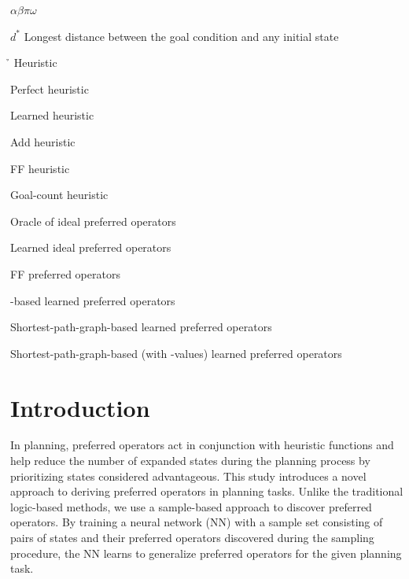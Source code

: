 \documentclass[ppgc,diss,english]{iiufrgs}
\begin{document}
\begin{listofsymbols}{$\alpha\beta\pi\omega$}
       \item[$d^{*}$] Longest distance between the goal condition and any initial state
       \item[\h] Heuristic
       \item[\hstar] Perfect heuristic
       \item[\hnn] Learned heuristic
       \item[\hadd] Add heuristic
       \item[\hff] FF heuristic
       \item[\hgc] Goal-count heuristic
       \item[\postartable] Oracle of ideal preferred operators
       \item[\postar] Learned ideal preferred operators
       \item[\poff] FF preferred operators
       \item[\pofsm] \bfsrw-based learned preferred operators
       \item[\pog] Shortest-path-graph-based learned preferred operators
       \item[\pogstar] Shortest-path-graph-based (with \hstar-values) learned preferred operators
\end{listofsymbols}

\listoffigures

\listoftables

\listofalgorithms

\tableofcontents

%
%
\chapter{Introduction}
\label{cha:introduction}
In planning, preferred operators act in conjunction with heuristic functions and help reduce the number of expanded states during the planning process by prioritizing states considered advantageous.
This study introduces a novel approach to deriving preferred operators in planning tasks. Unlike the traditional logic-based methods, we use a sample-based approach to discover preferred operators. By training a neural network (NN) with a sample set consisting of pairs of states and their preferred operators discovered during the sampling procedure, the NN learns to generalize preferred operators for the given planning task.
\end{document}
